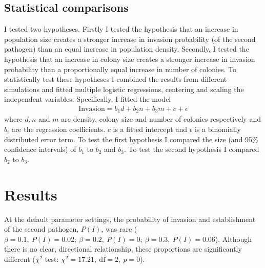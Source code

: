 \subsection{Statistical comparisons}

I tested two hypotheses.
Firstly I tested the hypothesis that an increase in population size creates a stronger increase in invasion probability (of the second pathogen) than an equal increase in population density.
Secondly, I tested the hypothesis that an increase in colony size creates a stronger increase in invasion probability than a proportionally equal increase in number of colonies.
To statistically test these hypotheses I combined the results from different simulations and fitted multiple logistic regressions, centering and scaling the independent variables.
Specifically, I fitted the model 
\begin{align}
  \text{Invasion} = b_1 d + b_2 n + b_3 m + c + \epsilon
\end{align}
where $d, n$ and $m$ are density, colony size and number of colonies respectively and $b_i$ are the regression coefficients. 
$c$ is a fitted intercept and $\epsilon$ is a binomially distributed error term.
To test the first hypothesis I compared the size (and 95\% confidence intervals) of $b_1$ to $b_2$ and $b_3$.
To test the second hypothesis I compared $b_2$ to $b_3$.








\section{Results}





At the default parameter settings, the probability of invasion and establishment of the second pathogen, $P(I)$,  was rare ($\beta = 0.1,\: P(I) = 0.02;\: \beta = 0.2,\: P(I) = 0;\: \beta = 0.3,\: P(I) = 0.06$).
Although there is no clear, directional relationship, these proportions are significantly different ($\chi^2$ test: $\chi^2 = 17.21,\: \text{df} = 2,\: p = 0$).

